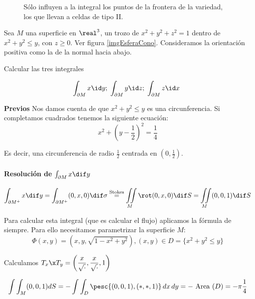 \begin{figure}[hbtp]
  \begin{center}
    
  \end{center}
  \caption{Sólo influyen a la integral los puntos de la frontera de la variedad, los que llevan a celdas de tipo II.}
  \label{imgStokesCeldasIntegral}
\end{figure}

\begin{example}
Sea $M$ una superficie en $\real^3$, un trozo de $x^2+y^2+z^2 = 1$ dentro de $x^2+y^2\leq y$, con $z\geq 0$. Ver figura \ref{imgEsferaCono}. Consideramos la orientación positiva como la de la normal hacia abajo.



Calcular las tres integrales

\[ \int_{\partial M} x \id y;\;\int_{\partial M} y \id z;\; \int_{\partial M} z \id x \]

\textbf{Previos} Nos damos cuenta de que $x^2+y^2\leq y$ es una circunferencia. Si completamos cuadrados tenemos la siguiente ecuación: \[x^2+\left(y-\frac{1}{2}\right)^2 = \frac{1}{4}\]

Es decir, una circunferencia de radio $\frac{1}{2}$ centrada en $(0,\frac{1}{2})$.

\paragraph{Resolución de $\int_{\partial M} x \dif y$}

\[
\int_{\partial M^{+}} x\dif y =\int_{\partial M^{+}} (0,x,0) \dif\sigma \stackrel{\mathrm{Stokes} }{=} \iint\limits_M \rot (0,x,0) \dif S = \iint\limits_M (0,0,1) \dif S
\]

Para calcular esta integral (que es calcular el flujo) aplicamos la fórmula de siempre. Para ello necesitamos parametrizar la superficie $M$:
\begin{equation}\label{eqEjStokes}
\Phi(x,y) = (x,y,\sqrt{1-x^2+y^2}), (x,y)\in D = \{x^2+y^2\leq y\} 
\end{equation}

Calculamos $T_x\x T_y =\displaystyle \left(\frac{x}{\sqrt{\cdot}},\frac{x}{\sqrt{\cdot}},1\right)$

\[
\int \int_M (0,0,1) dS = - \int \int_D \pesc{(0,0,1),(\ast,\ast,1)} \,dx\,dy = -\text{ Area } (D) = -\pi\frac{1}{4}
\]


\end{example}
